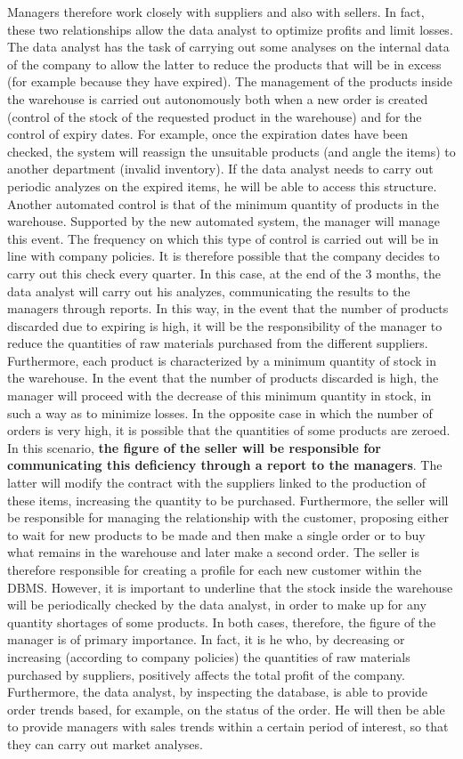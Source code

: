 Managers therefore work closely with suppliers and also with sellers. In fact, these two relationships allow the data analyst to optimize profits and limit losses. The data analyst has the task of carrying out some analyses on the internal data of the company to allow the latter to reduce the products that will be in excess (for example because they have expired). The management of the products inside the warehouse is carried out autonomously both when a new order is created (control of the stock of the requested product in the warehouse) and for the control of expiry dates. For example, once the expiration dates have been checked, the system will reassign the unsuitable products (and angle the items) to another department (invalid inventory). If the data analyst needs to carry out periodic analyzes on the expired items, he will be able to access this structure. Another automated control is that of the minimum quantity of products in the warehouse. Supported by the new automated system, the manager will manage this event. The frequency on which this type of control is carried out will be in line with company policies. It is therefore possible that the company decides to carry out this check every quarter. In this case, at the end of the 3 months, the data analyst will carry out his analyzes, communicating the results to the managers through reports. In this way, in the event that the number of products discarded due to expiring is high, it will be the responsibility of the manager to reduce the quantities of raw materials purchased from the different suppliers. Furthermore, each product is characterized by a minimum quantity of stock in the warehouse. In the event that the number of products discarded is high, the manager will proceed with the decrease of this minimum quantity in stock, in such a way as to minimize losses. In the opposite case in which the number of orders is very high, it is possible that the quantities of some products are zeroed. In this scenario, \textbf{the figure of the seller will be responsible for communicating this deficiency through a report to the managers}. The latter will modify the contract with the suppliers linked to the production of these items, increasing the quantity to be purchased. Furthermore, the seller will be responsible for managing the relationship with the customer, proposing either to wait for new products to be made and then make a single order or to buy what remains in the warehouse and later make a second order. The seller is therefore responsible for creating a profile for each new customer within the DBMS. However, it is important to underline that the stock inside the warehouse will be periodically checked by the data analyst, in order to make up for any quantity shortages of some products. In both cases, therefore, the figure of the manager is of primary importance. In fact, it is he who, by decreasing or increasing (according to company policies) the quantities of raw materials purchased by suppliers, positively affects the total profit of the company. Furthermore, the data analyst, by inspecting the database, is able to provide order trends based, for example, on the status of the order. He will then be able to provide managers with sales trends within a certain period of interest, so that they can carry out market analyses.


